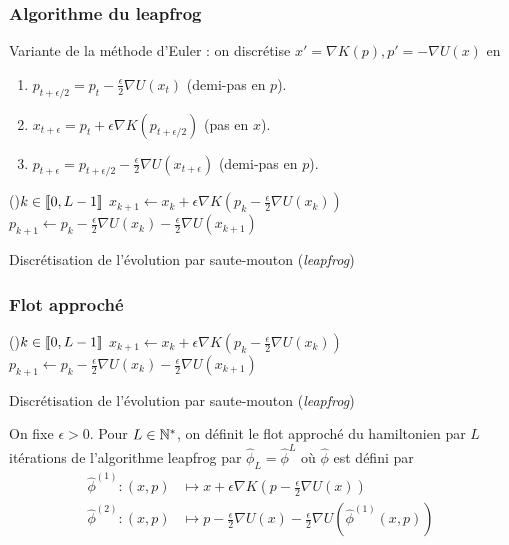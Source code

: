 \documentclass[10pt]{beamer}
\begin{document}
\begin{frame}
	\frametitle{Algorithme du leapfrog}
	Variante de la méthode d'Euler : on discrétise $x' = \nabla K(p), p' = - \nabla U(x)$ en
	\begin{enumerate}
		\item $p_{t+\epsilon/2} = p_t - \frac{\epsilon}{2} \nabla U(x_t)$ (demi-pas en $p$).
		\item $x_{t+\epsilon} = p_t + \epsilon \nabla K(p_{t+\epsilon/2})$ (pas en $x$).
		\item $p_{t+\epsilon} = p_{t+\epsilon/2} - \frac{\epsilon}{2} \nabla U(x_{t+\epsilon})$ (demi-pas en $p$).
	\end{enumerate}
	\begin{center}
		\begin{algorithm}[H]
			\For(){$k \in {\left\llbracket 0, L-1 \right\rrbracket}$}{
				$x_{k+1} \leftarrow x_k + \epsilon \nabla K \left( p_k - \frac{\epsilon}{2} \nabla U(x_k) \right)$\;
				$p_{k+1} \leftarrow p_k - \frac{\epsilon}{2} \nabla U(x_k) - \frac{\epsilon}{2} \nabla U(x_{k+1})$\;
			}
			\caption{Discrétisation de l'évolution par saute-mouton ({\it leapfrog})}
			\label{algo:leapfrog}
		\end{algorithm}
	\end{center}
\end{frame}

\begin{frame}
	\frametitle{Flot approché}
	\begin{center} %
		\small
		\begin{algorithm}[H]
			\For(){$k \in {\left\llbracket 0, L-1 \right\rrbracket}$}{
				$x_{k+1} \leftarrow x_k + \epsilon \nabla K \left( p_k - \frac{\epsilon}{2} \nabla U(x_k) \right)$\;
				$p_{k+1} \leftarrow p_k - \frac{\epsilon}{2} \nabla U(x_k) - \frac{\epsilon}{2} \nabla U(x_{k+1})$\;
			}
                        \caption{Discrétisation de l'évolution par saute-mouton ({\it leapfrog})}
		\end{algorithm}
	\end{center}
	\begin{Def} \label{def:flot_approche}
		On fixe $\epsilon > 0$. Pour $L \in \mathbb{N}^*$, on définit le flot approché du hamiltonien par $L$ itérations de l'algorithme leapfrog par $\hat{\phi}_L = \hat{\phi}^L$ où $\hat \phi$ est défini par
		\begin{align*}
		\hat{\phi}^{(1)} : (x,p) & \mapsto x + \epsilon \nabla K \left( p - \frac{\epsilon}{2} \nabla U(x) \right) \\
		\hat{\phi}^{(2)} : (x,p) & \mapsto p - \frac{\epsilon}{2} \nabla U(x) - \frac{\epsilon}{2} \nabla U(\hat{\phi}^{(1)}(x,p))
		\end{align*}
	\end{Def}
\end{frame}
\end{document}
